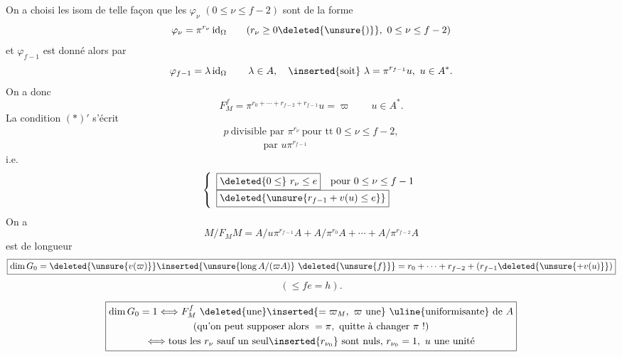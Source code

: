 
On a choisi les isom de telle façon que les $\varphi_\nu$ $(0\leq\nu\leq f-2)$ sont de la forme
\[
\varphi_\nu=\pi^{r_\nu}\operatorname{id}_\Omega\qquad(r_\nu\geq0\deleted{\unsure{)}},\ 0\leq\nu\leq f-2)
\]
et $\varphi_{f-1}$ est donné alors par
\[
\varphi_{f-1}=\lambda\operatorname{id}_\Omega\qquad\lambda\in A,\quad\inserted{\text{soit}}\ \lambda=\pi^{r_{f-1}}u,\ u\in A^*.
\]
 On a donc
\[
F_M^f=\pi^{r_0+\cdots+r_{f-2}+r_{f-1}}u=\varpi\qquad u\in A^*.
\]
La condition $(*)'$ s'écrit
\[
\begin{array}{l}
p\ \text{divisible par }\pi^{r_\nu}\ \text{pour tt }0\leq\nu\leq f-2,\\
\hspace{4em}\text{par }u\pi^{r_{f-1}}
\end{array}
\]
i.e.
\[
\left\{\begin{array}{l}
\boxed{\deleted{0\leq}\ r_\nu\leq e}\quad\text{pour }0\leq\nu\leq f-1\\
\boxed{\deleted{\unsure{r_{f-1}+v(u)\leq e}}}
\end{array}\right.
\]
On a
\[
M/F_MM=A/u\pi^{r_{f-1}}A+A/\pi^{r_0}A+\cdots+A/\pi^{r_{f-2}}A
\]
est de  longueur
\[
\boxed{\dim G_0=\deleted{\unsure{v(\varpi)}}\inserted{\unsure{\operatorname{long}A/(\varpi A)}\ \deleted{\unsure{f}}}=r_0+\cdots+r_{f-2}+(r_{f-1}\deleted{\unsure{+v(u)}})}
\]
\[
(\leq fe=h).
\]

\[
\boxed{\begin{gathered}
\dim G_0=1\Longleftrightarrow F_M^f\ \deleted{\text{une}}\inserted{=\varpi_M,\ \varpi\ \text{une}}\ \text{\uline{uniformisante} de }A\\
\text{(qu'on peut supposer alors }=\pi,\ \text{quitte à changer }\pi\text{ !)}\\
\Longleftrightarrow\text{tous les }r_\nu\text{ sauf un seul}\inserted{r_{\nu_0}}\text{ sont nuls, }r_{\nu_0}=1,\ u\ \text{une unité}
\end{gathered}}
\]


